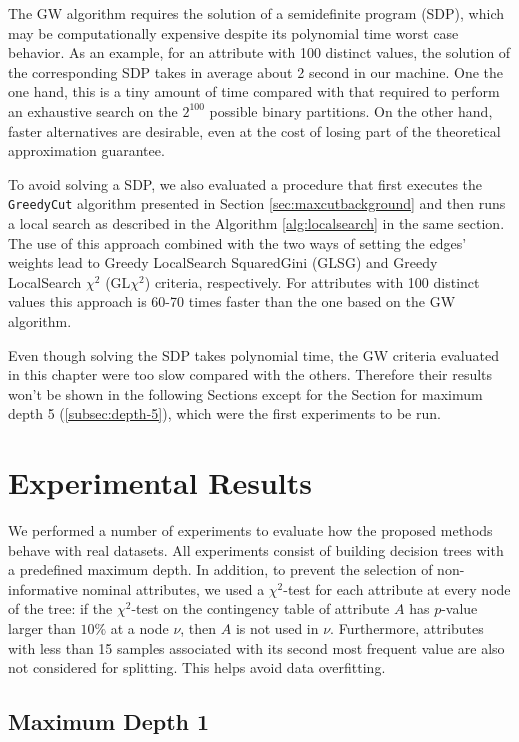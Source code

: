 The GW algorithm  requires  the solution of a semidefinite program (SDP),
which may be computationally expensive despite  its 
polynomial time worst case  behavior.
As an example, for an attribute with 100 distinct values, the solution of
the corresponding SDP takes in average about 2 second in our machine.
One the one hand, this is a tiny amount of time 
compared with that required to perform an exhaustive search on the $2^{100}$
possible binary partitions. On the other hand, 
 faster alternatives are desirable, even
at the cost of losing part of the theoretical approximation guarantee. 

To avoid solving a SDP, 
we also evaluated a procedure
that first executes the {\tt GreedyCut} algorithm presented
in Section \ref{sec:maxcutbackground} and then runs a local search as described
in the Algorithm  \ref{alg:localsearch} in the same section. 
The use of this approach combined with the two
ways of setting the edges' weights lead to
 Greedy LocalSearch SquaredGini (GLSG) and 
Greedy LocalSearch $\chi^2$ (GL$\chi^2$) 
criteria, respectively.
For attributes with 100 distinct values this approach is 60-70
times faster than the one based on the GW algorithm.

Even though solving the SDP takes polynomial time, the GW criteria evaluated in this chapter were too slow compared with the others. Therefore their results won't be shown in the following Sections except for the Section for maximum depth 5 (\ref{subsec:depth-5}), which were the first experiments to be run.


\section{Experimental Results}

We performed a number of experiments to evaluate how the
proposed methods behave with real datasets.
All experiments consist of building decision trees
with a predefined maximum depth.  In addition,
to prevent the selection of non-informative nominal attributes, 
we used a $\chi^2$-test for each attribute at every node of
the tree: if the $\chi^2$-test  on the contingency table of attribute $A$
has $p$-value larger than $10\%$ at a node $\nu$, then
$A$ is not used in $\nu$. Furthermore, attributes with less than 15 samples associated with its
second most frequent value are also not considered for splitting. This helps  avoid data overfitting.


\subsection{Maximum Depth 1}

